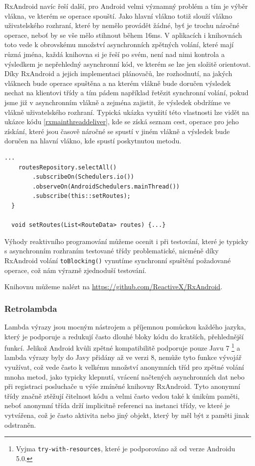 \documentclass[czech,master,public,dept460,male,java,cpdeclaration]{diploma}
\begin{document}
RxAndroid navíc řeší další, pro Android velmi významný problém a tím je výběr vlákna, ve kterém se
operace spouští. Jako hlavní vlákno totiž slouží vlákno uživatelského rozhraní, které by
nemělo provádět žádné, byť je trochu náročné operace, neboť by se vše mělo stihnout během 16ms\cite{perf}.
V aplikacích i knihovnách toto vede k obrovskému množství asynchronních zpětných volání, které mají různá jména,
každá knihovna si je řeší po svém, není nad nimi kontrola a výsledkem je nepřehledný asynchronní kód,
ve kterém se lze jen složitě orientovat. Díky RxAndroid a jejich implementaci plánovačů, lze rozhodnutí,
na jakých vláknech bude operace spuštěna a na kterém vlákně bude doručen výsledek nechat na klientovi třídy
a tím pádem například řetězit synchronní volání, pokud jsme již v asynchronním vlákně a zejména zajistit,
že výsledek obdržíme ve vlákně uživatelského rozhraní. Typická ukázka využití této vlastnosti
lze vidět na ukázce kódu \ref{rxmainthreaddeliver}, kde se získá seznam cest, operace pro jeho získání,
které jsou časově náročné se spustí v jiném vlákně a výsledek bude doručen na hlavní vlákno,
kde spustí poskytnutou metodu.


\begin{lstlisting}[label=rxmainthreaddeliver,caption=Reakce na událost v UI vlákně pomocí RxAndorid]
    ...
    routesRepository.selectAll()
        .subscribeOn(Schedulers.io())
        .observeOn(AndroidSchedulers.mainThread())
        .subscribe(this::setRoutes);
  }

  void setRoutes(List<RouteData> routes) {...}
\end{lstlisting}

Výhody reaktivního programování můžeme ocenit i při testování, které je typicky s asynchronním
rozhraním testované třídy problematické, nicméně díky RxAndroid volání \texttt{toBlocking()} vynutíme
synchronní spuštění požadované operace, což nám výrazně zjednoduší testování.

Knihovnu můžeme nalézt na \url{https://github.com/ReactiveX/RxAndroid}.

\subsubsection{Retrolambda}
Lambda výrazy jsou mocným nástrojem a příjemnou pomůckou každého jazyka, který je podporuje a redukují
často dlouhé bloky kódu do kratších, přehlednější funkcí. Jelikož Android kvůli zpětné
kompatibilitě podporuje pouze Javu 7
\footnote{Vyjma \texttt{try-with-resources}, které je podporováno až od verze Androidu 5.0.}
a lambda výrazy byly do Javy přidány až ve verzi 8, nemůže tyto funkce vývojář využívat,
což vede často k velkému množství anonymních tříd pro zpětné volání mnoha metod, jako typicky klepnutí,
vrácení načtených asynchronních dat nebo při registraci posluchače u výše zmíněné knihovny RxAndroid.
Tyto anonymní třídy značně ztěžují čitelnost kódu a velmi často vedou také k únikům paměti,
neboť anonymní třída drží implicitně referenci na instanci třídy, ve které je vytvářena, což je často
aktivita nebo jiný objekt, který by měl být z paměti jinak odstraněn.
\end{document}
